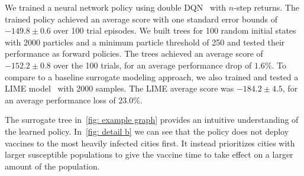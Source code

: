 \documentclass[letterpaper]{article} %
\begin{document}
We trained a neural network policy using double DQN~\cite{hasselt2010} with $n$-step returns.
The trained policy achieved an average score with one standard error bounds of $-149.8 \pm 0.6$ over 100 trial episodes.
We built trees for 100 random initial states with 2000 particles and a minimum particle threshold of 250 and tested their performance as forward policies.
The trees achieved an average score of $-152.2 \pm 0.8$ over the 100 trials, for an average performance drop of $1.6 \%$.
To compare to a baseline surrogate modeling approach, we also trained and tested a LIME model~\cite{ribeiro2016} with 2000 samples.
The LIME average score was $-184.2 \pm 4.5$, for an average performance loss of $23.0 \%$.

The surrogate tree in~\cref{fig: example graph} provides an intuitive understanding of the learned policy.
In~\cref{fig: detail b} we can see that the policy does not deploy vaccines to the most heavily infected cities first.
It instead prioritizes cities with larger susceptible populations to give the vaccine time to take effect on a larger amount of the population.
\end{document}

